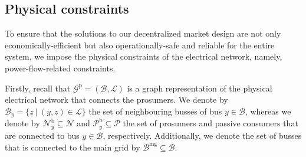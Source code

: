 \documentclass{IEEEtran}  %
\newtheorem{definition}{Definition}
\newcommand{\eod}{\ensuremath{\hfill\Box}}
\newcommand{\mc}{\mathcal}
\newcommand{\bb}{\mathbb}
\newcommand{\col}{\operatorname{col}}
\newcommand{\0}{\mathbf{0}}
\newcommand{\1}{\mathbf{1}}
\begin{document}

\subsection{Physical constraints}

To ensure that the solutions to our decentralized market design are not only economically-efficient but also operationally-safe and reliable for the entire system, we impose the physical constraints of the electrical network, namely, power-flow-related constraints.

Firstly, recall that $\mc G^{\mathrm p}=(\mc B, \mc L)$ is a graph representation of the physical electrical network that connects the prosumers. We  denote by $\mc B_y =\{z~|~(y,z) \in \mc L\}$ the set of neighbouring busses of bus $y \in \mc B$, whereas we denote by $\mc N_y^{\mathrm b} \subseteq \mc N$ and $\mc P_y^\mathrm{b} \subseteq \mc P$ the set of prosumers and passive consumers that are connected to bus $y \in \mc B$, respectively. 
Additionally, we denote the set of busses that is connected to the main grid by $\mc B^{\mathrm{mg}} \subseteq \mc B$.
\end{document}

